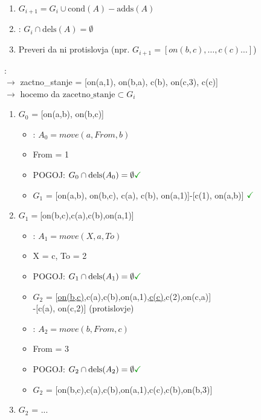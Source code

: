 \begin{enumerate}[noitemsep,topsep=0pt,leftmargin=*]
\item $G_{i+1} = G_i \cup \text{cond}(A) - \text{adds}(A)$
\item {}: $G_{i} \cap \text{dels}(A) = \emptyset$
\item Preveri da ni protislovja (npr. $G_{i+1} = \left[on(b,c), \dots, c(c) \dots\right]$)
\end{enumerate}

:\\
$\rightarrow$ zactno\_stanje = [on(a,1), on(b,a), c(b), on(c,3), c(c)]\\
$\rightarrow$ hocemo da $\text{zacetno\_stanje} \subset G_i$
\begin{enumerate}[noitemsep,topsep=0pt,leftmargin=*,]
    \item $G_0$ = [on(a,b), on(b,c)]
    \begin{itemize}[noitemsep,topsep=0pt,leftmargin=0.5cm]
        \item {}: $A_0=move(a, From, b)$
        \item From = 1
        \item POGOJ: $G_0 \cap \text{dels}(A_0) = \emptyset \green{\checkmark}$
        \item $G_1$ = [on(a,b), on(b,c), c(a), c(b), on(a,1)]-[c(1), on(a,b)] $\green{\checkmark}$
    \end{itemize}
    \item $G_1=$[on(b,c),c(a),c(b),on(a,1)]
    \begin{itemize}[noitemsep,topsep=0pt,leftmargin=0.5cm]
        \item {}: $A_1=move(X, a, To)$
        \item X = c, To = 2
        \item POGOJ: $G_1 \cap \text{dels}(A_1) = \emptyset \green{\checkmark}$
        \item $G_2$ = [\underline{on(b,c)},c(a),c(b),on(a,1),\underline{c(c)},c(2),on(c,a)]\\ -[c(a), on(c,2)] \xmark (protislovje)
        \item {}: $A_2=move(b, From, c)$
        \item From = 3
        \item POGOJ: $G_2 \cap \text{dels}(A_2) = \emptyset \green{\checkmark}$
        \item $G_2$ = [on(b,c),c(a),c(b),on(a,1),c(c),c(b),on(b,3)] \cmark
    \end{itemize}
    \item $G_2$ = ...     
\end{enumerate}


